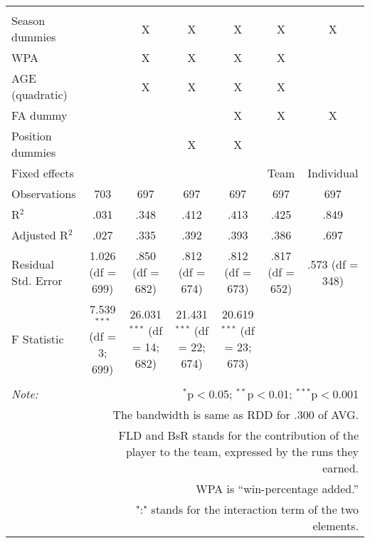 \begin{table}[H]
\begin{tabular}{@{\extracolsep{5pt}}lcccccc}
  & & & & & & \\
\hline \\[-1.8ex]
Season dummies &  & X & X & X & X & X \\
WPA &  & X & X & X & X &  \\
AGE (quadratic) &  & X & X & X & X &  \\
FA dummy &  &  &  & X & X & X \\
Position dummies &  &  & X & X &  &  \\
Fixed effects &  &  &  &  & Team & Individual \\
Observations & 703 & 697 & 697 & 697 & 697 & 697 \\
R$^{2}$ & .031 & .348 & .412 & .413 & .425 & .849 \\
Adjusted R$^{2}$ & .027 & .335 & .392 & .393 & .386 & .697 \\
Residual Std. Error & 1.026 (df = 699) & .850 (df = 682) & .812 (df = 674) & .812 (df = 673) & .817 (df = 652) & .573 (df = 348) \\
F Statistic & 7.539$^{***}$ (df = 3; 699) & 26.031$^{***}$ (df = 14; 682) & 21.431$^{***}$ (df = 22; 674) & 20.619$^{***}$ (df = 23; 673) &  &  \\
\hline
\hline \\[-1.8ex]
\textit{Note:}  & \multicolumn{6}{r}{$^{*}$p$<$0.05; $^{**}$p$<$0.01; $^{***}$p$<$0.001} \\
& \multicolumn{6}{r}{The bandwidth is same as RDD for .300 of AVG.} \\
& \multicolumn{6}{r}{FLD and BsR stands for the contribution of the player to the team, expressed by the runs they earned.} \\
& \multicolumn{6}{r}{WPA is ``win-percentage added.''} \\
& \multicolumn{6}{r}{":" stands for the interaction term of the two elements.} \\
\end{tabular}
\end{table}
